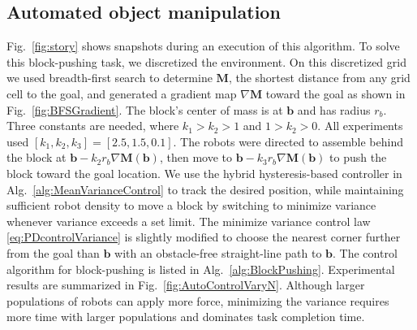 \subsection{Automated object manipulation}
Fig.~\ref{fig:story} shows snapshots during an execution of this algorithm. To solve this block-pushing task, we discretized the environment. On this discretized grid we used breadth-first search to determine $\mathbf{M}$, the shortest distance from any grid cell to the goal, and generated a gradient map $\nabla \mathbf{M}$ toward the goal as shown in Fig.~\ref{fig:BFSGradient}.  The block's center of mass is at $\mathbf{b}$ and has radius $r_b$. 
Three constants are needed, where $k_1>k_2>1$ and $1>k_2>0$. All experiments used $[k_1,k_2,k_3] = [2.5,1.5,0.1]$.
The robots were directed to assemble behind the block at  $\mathbf{b} - k_2 r_b \nabla \mathbf{M}(\mathbf{b})$, then move to  $\mathbf{b} - k_3 r_b \nabla \mathbf{M}(\mathbf{b})$ to push the block toward the goal location. We use the hybrid hysteresis-based controller in Alg.~\ref{alg:MeanVarianceControl}  to track the desired position, while maintaining sufficient robot density to move a block by switching to minimize variance whenever variance exceeds a set limit. The minimize variance control law \eqref{eq:PDcontrolVariance} is slightly modified to choose the nearest corner further from the goal than $\mathbf{b}$ with an obstacle-free straight-line path to $\mathbf{b}$. 
The control algorithm  for block-pushing is listed in Alg.~\ref{alg:BlockPushing}. 
Experimental results are summarized in Fig.~\ref{fig:AutoControlVaryN}.  Although larger populations of robots can apply more force, minimizing the variance requires more time with larger populations and dominates task completion time.


